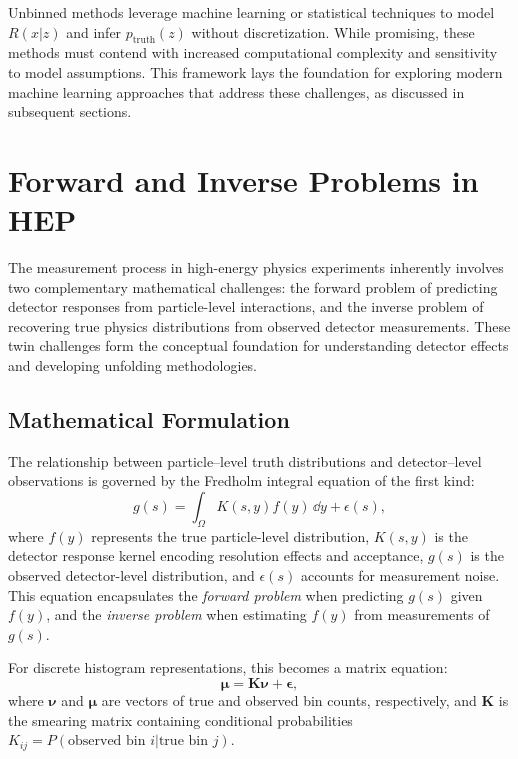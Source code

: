 Unbinned methods leverage machine learning or statistical techniques to model \(R(x|z)\) and infer \(p_{\text{truth}}(z)\) without discretization.
%
While promising, these methods must contend with increased computational complexity and sensitivity to model assumptions.
%
This framework lays the foundation for exploring modern machine learning approaches that address these challenges, as discussed in subsequent sections.

\section{Forward and Inverse Problems in HEP}

The measurement process in high-energy physics experiments inherently involves two complementary mathematical challenges: the forward problem of predicting detector responses from particle-level interactions, and the inverse problem of recovering true physics distributions from observed detector measurements. These twin challenges form the conceptual foundation for understanding detector effects and developing unfolding methodologies.

\subsection{Mathematical Formulation}

The relationship between particle--level truth distributions and detector--level observations is governed by the Fredholm integral equation of the first kind:
\begin{equation}
    g(s) = \int_\Omega K(s,y)f(y) \, \dd y + \epsilon(s),
\end{equation}
where \(f(y)\) represents the true particle-level distribution, \(K(s,y)\) is the detector response kernel encoding resolution effects and acceptance, \(g(s)\) is the observed detector-level distribution, and \(\epsilon(s)\) accounts for measurement noise. This equation encapsulates the \textit{forward problem} when predicting \(g(s)\) given \(f(y)\), and the \textit{inverse problem} when estimating \(f(y)\) from measurements of \(g(s)\).

For discrete histogram representations, this becomes a matrix equation:
\begin{equation}
    \boldsymbol{\mu} = \mathbf{K}\boldsymbol{\nu} + \boldsymbol{\epsilon},
\end{equation}
where \(\boldsymbol{\nu}\) and \(\boldsymbol{\mu}\) are vectors of true and observed bin counts, respectively, and \(\mathbf{K}\) is the smearing matrix containing conditional probabilities \(K_{ij} = P(\text{observed bin } i | \text{true bin } j)\).

